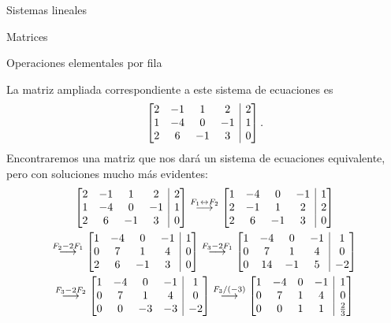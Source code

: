 \begin{chapter}{Sistemas lineales}
\begin{section}{Matrices}
\begin{subsection}{Operaciones elementales por fila}
\begin{ejemplo*}
                    
                    La matriz ampliada  correspondiente a este sistema de ecuaciones es 
                    $$
                    \left[\begin{array}{@{}*{4}{c}|c@{}} 
                     2& -1&1& 2&2 \\ 1&-4 &0&-1&1 \\ 2&6&-1&3&0 \end{array}\right].
                    $$
                    Encontraremos una matriz que nos dará un sistema de ecuaciones equivalente, pero con soluciones mucho más evidentes:
                    \begin{multline*}
                    \left[\begin{array}{@{}*{4}{c}|c@{}}  2& -1&1& 2&2 \\ 1&-4 &0&-1&1 \\ 2&6&-1&3&0 \end{array}\right]
                    \stackrel{F_1\leftrightarrow F_2}{\longrightarrow} 
                    \left[\begin{array}{@{}*{4}{c}|c@{}}  1&-4 &0&-1&1 \\ 2& -1&1& 2&2 \\ 2&6&-1&3&0 \end{array}\right]
                    \\
                    \stackrel{F_2-2 F_1}{\longrightarrow} 
                    \left[\begin{array}{@{}*{4}{c}|c@{}}  1&-4 &0&-1&1 \\ 0& 7&1& 4&0 \\ 2&6&-1&3&0 \end{array}\right]
                    \stackrel{F_3-2 F_1}{\longrightarrow} 
                    \left[\begin{array}{@{}*{4}{c}|c@{}}  1&-4 &0&-1&1 \\ 0& 7&1& 4&0 \\ 0&14&-1&5&-2 \end{array}\right] 
                    \\
                    \stackrel{F_3-2 F_2}{\longrightarrow} 
                    \left[\begin{array}{@{}*{4}{c}|c@{}}  1&-4 &0&-1&1 \\ 0& 7&1& 4&0 \\ 0&0&-3&-3&-2 \end{array}\right]  
                    \stackrel{F_3/(-3)}{\longrightarrow} 
                    \left[\begin{array}{@{}*{4}{c}|c@{}}  1&-4 &0&-1&1 \\ 0& 7&1& 4&0 \\ 0&0&1&1&\frac{2}{3} \end{array}\right]

\end{multline*}
\end{ejemplo*}
\end{subsection}
\end{section}
\end{chapter}
